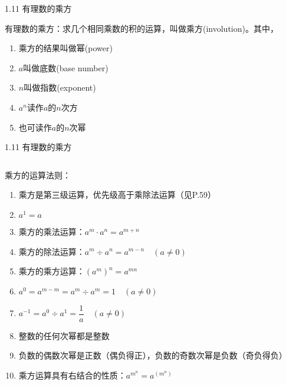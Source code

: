 \documentclass[aspectratio=169]{ctexbeamer} %
\date{\today}
\begin{document}
\begin{frame}[t]{1.11 有理数的乘方}
\begin{spacing}{1.2}
\normalsize
有理数的乘方：求几个相同乘数的积的运算，叫做乘方(involution)。其中，
\begin{enumerate}[label={\arabic*.}]
\item 乘方的结果叫做幂(power)
\item $a$叫做底数(base number)
\item $n$叫做指数(exponent)
\item $a^n$读作$a$的$n$次方
\item 也可读作$a$的$n$次幂
\end{enumerate}

\end{spacing}
\end{frame}

\begin{frame}[t]{1.11 有理数的乘方}
\begin{columns}
\begin{spacing}{1.2}
\normalsize
乘方的运算法则：
\begin{enumerate}[label={\arabic*.}]
\item 乘方是第三级运算，优先级高于乘除法运算（见P.59）
\item $a^1 = a$
\item 乘方的乘法运算：$ a^m \cdot a^n = a ^{m+n}$
\item 乘方的除法运算：$ a^m ÷ a^n = a ^{m-n} \quad (a \ne 0)$
\item 乘方的乘方运算：$(a^m)^n = a^{mn}$
\item $ a^0 = a^{m-m} = a^m ÷ a^m = 1 \quad (a \ne 0)$
\item $ a^{-1} = a^0 ÷ a^1 = \dfrac{1}{a} \quad (a \ne 0)$
\item 整数的任何次幂都是整数
\item 负数的偶数次幂是正数（偶负得正），负数的奇数次幂是负数（奇负得负）
\item 乘方运算具有右结合的性质：$a^{m^n} = a^{(m^n)}$ 
\end{enumerate}
\end{spacing}
\end{columns}
\end{frame}
\end{document}

